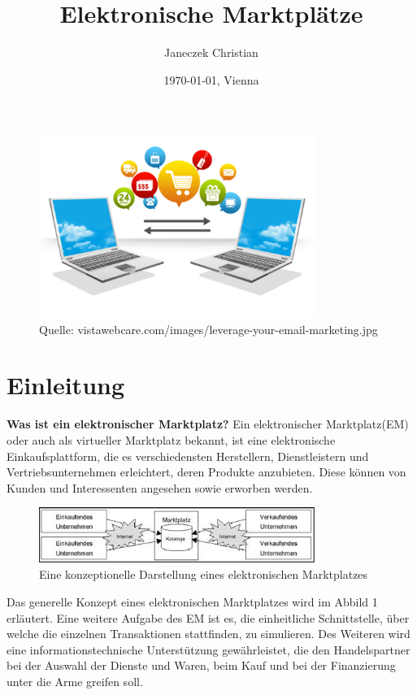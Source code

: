\documentclass[11pt,a4paper]{article}
\title{Elektronische Marktplätze}
\author{Janeczek Christian}
\affil{IT Abteilung am TGM Wien}
\date{\today{}, Vienna}
\begin{document}
\thispagestyle{empty}

\maketitle
\begin{figure}[ht!]
	\centering
	\includegraphics[width=90mm]{elektronischer-handel}
	\caption{Quelle: vistawebcare.com/images/leverage-your-email-marketing.jpg
		\label{elektronischer-handel}}
\end{figure} 
\newpage
\tableofcontents
\newpage

\section{Einleitung}

\textbf{Was ist ein elektronischer Marktplatz?} \newline \newline
Ein elektronischer Marktplatz(EM) oder auch als virtueller Marktplatz bekannt, ist eine elektronische Einkaufsplattform, die es verschiedensten Herstellern, Dienstleistern und Vertriebsunternehmen erleichtert, deren Produkte anzubieten. Diese können von Kunden und Interessenten angesehen sowie erworben werden. \newline
	
\begin{figure}[ht!]
	\centering
	\includegraphics[width=90mm]{eprocurement}
	\caption{Eine konzeptionelle Darstellung eines elektronischen Marktplatzes \label{eprocurement}}
\end{figure}

\noindent Das generelle Konzept eines elektronischen Marktplatzes wird im Abbild 1 erläutert. Eine weitere Aufgabe des EM ist es, die einheitliche Schnittstelle, über welche die einzelnen Transaktionen stattfinden, zu simulieren. Des Weiteren wird eine informationstechnische Unterstützung gewährleistet, die den Handelspartner bei der Auswahl der Dienste und Waren, beim Kauf und bei der Finanzierung unter die Arme greifen soll.
\end{document}
